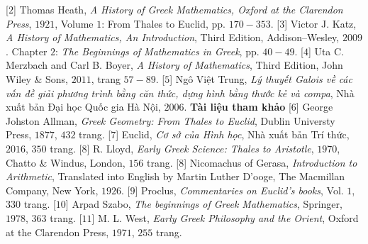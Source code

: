 \begin{multicols}{2}
	\vskip 0.05cm
	[$2$] Thomas Heath, \textit{A History of Greek Mathematics, Oxford at the Clarendon Press}, $1921$, Volume $1$: From Thales to Euclid, pp. $170-353$.
	\vskip 0.05cm   
	[$3$] Victor J. Katz, \textit{A History of Mathematics, An Introduction}, Third Edition, Addison--Wesley, $2009$. Chapter $2$: \textit{The Beginnings of Mathematics in Greek}, pp. $40-49$.
	\vskip 0.05cm
	[$4$] Uta C. Merzbach and Carl B. Boyer, \textit{A
	History of Mathematics}, Third Edition, John Wiley \& Sons, $2011$, trang $57-89$.
	\vskip 0.05cm
	[$5$] Ngô Việt Trung, \textit{Lý thuyết Galois về các vấn đề giải phương trình bằng căn thức, dựng hình bằng thước kẻ và compa}, Nhà xuất bản Đại học Quốc gia Hà Nội, $2006$.
	\vskip 0.05cm
	\textbf{\color{lichsutoanhoc}Tài liệu tham khảo}
	\vskip 0.05cm 
	[$6$] George Johston Allman, \textit{Greek Geometry: From Thales to Euclid}, Dublin Universty Press, $1877$, $432$ trang.  
	\vskip 0.05cm
	[$7$] Euclid, \textit{Cơ sở của Hình học}, Nhà xuất bản Trí thức, $2016$, $350$ trang.
	\vskip 0.05cm
	[$8$] R. Lloyd, \textit{Early Greek Science: Thales to Aristotle}, $1970$, Chatto \& Windus, London, $156$ trang. 
	\vskip 0.05cm
	[$8$] Nicomachus of Gerasa, \textit{Introduction to Arithmetic}, Translated into English by Martin Luther D’ooge, The Macmillan Company, New York, $1926$.
	\vskip 0.05cm
	[$9$] Proclus, \textit{Commentaries on Euclid’s books}, Vol. $1$, $330$ trang.
	\vskip 0.05cm
	[$10$] Arpad Szabo, \textit{The beginnings of Greek Mathematics}, Springer, $1978$, $363$ trang.
	\vskip 0.05cm
	[$11$] M. L. West, \textit{Early Greek Philosophy and the Orient}, Oxford at the Clarendon Press, $1971$, $255$ trang.
\end{multicols}
